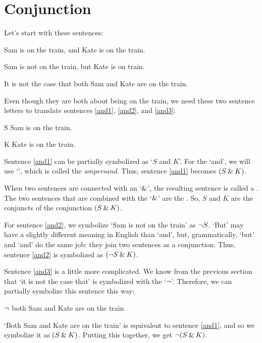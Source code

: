 \section{Conjunction}
\label{s:ConnectiveConjunction}

Let's start with these sentences:
	\begin{earg}
		\item[\ex{and1}] Sam is on the train, and Kate is on the train.
		\item[\ex{and2}] Sam is not on the train, but Kate is on train.
		\item[\ex{and3}] It is not the case that both Sam and Kate are on the train.
	\end{earg}
Even though they are both about being on the train, we need these two sentence letters to translate sentences \ref{and1}, \ref{and2}, and \ref{and3}:
	\begin{ekey}
		\item[S] Sam is on the train.
		\item[K] Kate is on the train.
	\end{ekey}
Sentence \ref{and1} can be partially symbolized as `$S$ and $K$'. For the `and', we will use `\eand', which is called the \textit{ampersand}. Thus, sentence \ref{and1} becomes $(S\mathbin{\&} K)$. 

When two sentences are connected with an `$\mathbin{\&}$', the resulting sentence is called a . The two sentences that are combined with the `$\mathbin{\&}$' are the . So, $S$ and $K$ are the conjuncts of the conjunction $(S \mathbin{\&} K)$.

For sentence \ref{and2}, we symbolize `Sam is not on the train' as ${\neg} S$. `But' may have a slightly different meaning in English than `and', but, grammatically, `but' and `and' do the same job: they join two sentences as a conjunction. Thus, sentence \ref{and2} is symbolized as $({\neg} S \mathbin{\&} K)$.

Sentence \ref{and3} is a little more complicated. We know from the previous section that `it is not the case that' is symbolized with the `${\neg}$'. Therefore, we can partially symbolize this sentence this way:
	\begin{earg}
		\item[] ${\neg}$ both Sam and Kate are on the train
	\end{earg}
`Both Sam and Kate are on the train' is equivalent to sentence \ref{and1}, and so we symbolize it as $(S \mathbin{\&} K)$. Putting this together, we get ${\neg}(S \mathbin{\&} K)$. 

